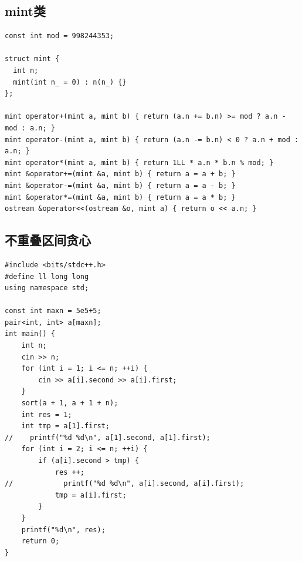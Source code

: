 \documentclass[twoside]{article}
\begin{document}
\subsection{mint类}
\begin{lstlisting}
const int mod = 998244353;

struct mint {
  int n;
  mint(int n_ = 0) : n(n_) {}
};

mint operator+(mint a, mint b) { return (a.n += b.n) >= mod ? a.n - mod : a.n; }
mint operator-(mint a, mint b) { return (a.n -= b.n) < 0 ? a.n + mod : a.n; }
mint operator*(mint a, mint b) { return 1LL * a.n * b.n % mod; }
mint &operator+=(mint &a, mint b) { return a = a + b; }
mint &operator-=(mint &a, mint b) { return a = a - b; }
mint &operator*=(mint &a, mint b) { return a = a * b; }
ostream &operator<<(ostream &o, mint a) { return o << a.n; }
\end{lstlisting}
\subsection{不重叠区间贪心}
\begin{lstlisting}
#include <bits/stdc++.h>
#define ll long long
using namespace std;

const int maxn = 5e5+5;
pair<int, int> a[maxn];
int main() {
    int n;
    cin >> n;
    for (int i = 1; i <= n; ++i) {
        cin >> a[i].second >> a[i].first;
    }
    sort(a + 1, a + 1 + n);
    int res = 1;
    int tmp = a[1].first;
//    printf("%d %d\n", a[1].second, a[1].first);
    for (int i = 2; i <= n; ++i) {
        if (a[i].second > tmp) {
            res ++;
//            printf("%d %d\n", a[i].second, a[i].first);
            tmp = a[i].first;
        }
    }
    printf("%d\n", res);
    return 0;
}

\end{lstlisting}
\end{document}
